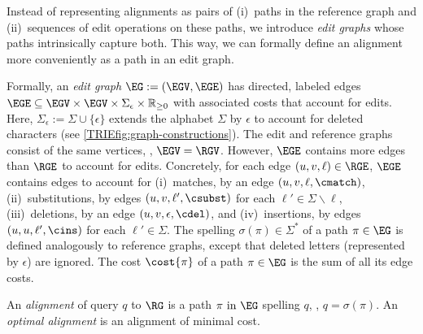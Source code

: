 Instead of representing alignments as pairs of (i)~paths in the reference graph and
(ii)~sequences of edit operations on these paths, we introduce \textit{edit
graphs} whose paths intrinsically capture both. This way, we can
formally define an alignment more conveniently as a path in an edit graph.

Formally, an \emph{edit graph} $\EG:=(\EGV,\EGE)$ has directed, labeled edges
$\EGE \subseteq \EGV \times \EGV \times \Sigma_\epsilon \times \mathbb{R}_{\geq
0}$ with associated costs that account for edits. Here, $\Sigma_\epsilon :=
\Sigma \cup \{\epsilon\}$ extends the alphabet $\Sigma$ by $\epsilon$ to account
for deleted characters (see \cref{TRIEfig:graph-constructions}).
%
The edit and reference graphs consist
of the same vertices, \ie, $\EGV=\RGV$. However, $\EGE$ contains more edges
than $\RGE$ to account for edits.
%
Concretely, for each edge $(u,v,\ell) \in \RGE$, $\EGE$ contains edges to
account for (i)~matches, by an edge $(u,v,\ell,\cmatch)$, (ii)~substitutions, by
edges $(u,v,\ell',\csubst)$ for each $\ell' \in \Sigma \backslash \ell$,
(iii)~deletions, by an edge $(u,v,\epsilon,\cdel)$, and (iv)~insertions, by
edges $(u,u,\ell',\cins)$ for each $\ell' \in \Sigma$.
%
The spelling $\sigma(\pi) \in \Sigma^*$ of a path $\pi \in \EG$ is defined
analogously to reference graphs, except that deleted letters (represented by
$\epsilon$) are ignored. The cost $\cost{\pi}$ of a path $\pi \in \EG$ is the
sum of all its edge costs.

An \emph{alignment} of query $q$ to $\RG$ is a path $\pi \text{ in } \EG$
spelling $q$, \ie, $q=\sigma(\pi)$. An \emph{optimal alignment} is an alignment
of minimal cost.
